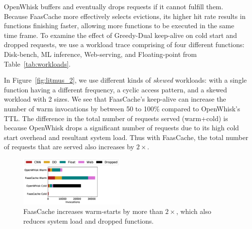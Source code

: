 OpenWhisk buffers and eventually drops requests if it cannot fulfill them.
Because FaasCache more effectively selects evictions, its higher hit rate results in functions finishing faster, allowing more functions to be executed in the same time frame.  
%
To examine the effect of Greedy-Dual keep-alive on cold start and dropped requests, we use a workload trace comprising of four different functions: Disk-bench, ML inference, Web-serving, and Floating-point from Table~\ref{tab:workloads}.

In Figure~\ref{fig:litmus_2}, we use different kinds of \emph{skewed} workloads: with a single function having a different frequency, a cyclic access pattern, and a skewed workload with 2 sizes. 
We see that FaasCache's keep-alive can increase the number of warm invocations by between 50 to 100\% compared to OpenWhisk's TTL.
The difference in the total number of requests served (warm+cold) is because OpenWhisk drops a significant number of requests due to its high cold start overhead and resultant system load. 
%
Thus with FaasCache, the total number of requests that are served also increases by $2\times$. 

%







\begin{figure}[t]
  \centering
\includegraphics[width=0.47\textwidth]{../graphs/litmus_tests/faasbench_48_cold_hot-legend.pdf}
\caption{FaasCache increases warm-starts by more than $2\times$, which also reduces system load and dropped functions.}
\label{fig:faasbench}
\end{figure}


